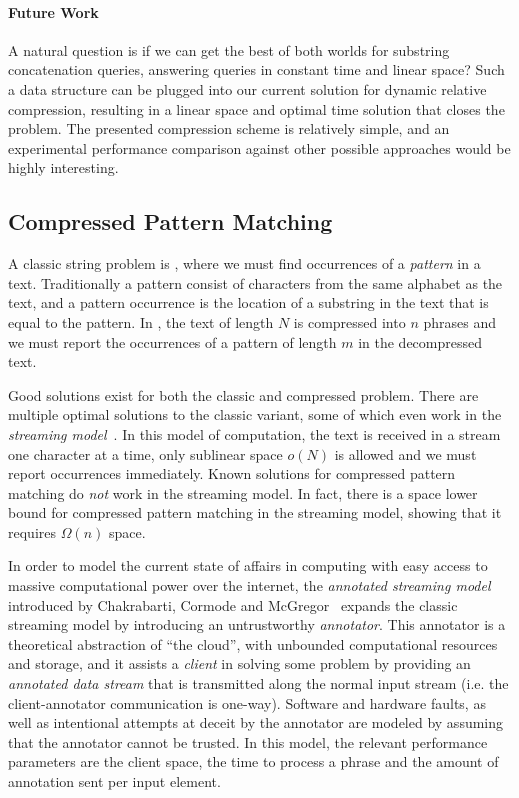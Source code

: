 \paragraph{Future Work}
A natural question is if we can get the best of both worlds for substring concatenation queries, answering queries in constant time and linear space? Such a data structure can be plugged into our current solution for dynamic relative compression, resulting in a linear space and optimal time solution that closes the problem.
The presented compression scheme is relatively simple, and an experimental performance comparison against other possible approaches would be highly interesting. 


\subsection{Compressed Pattern Matching}
A classic string problem is , where we must find occurrences of a \emph{pattern} in a text. Traditionally a pattern consist of characters from the same alphabet as the text, and a pattern occurrence is the location of a substring in the text that is equal to the pattern.
In , the text of length $N$ is compressed into $n$ phrases and we must report the occurrences of a pattern of length $m$ in the decompressed text. 

Good solutions exist for both the classic and compressed problem. There are multiple optimal solutions to the classic variant, some of which even work in the \emph{streaming model}~\cite{munro1980selection, flajolet1985probabilistic, alon1999space}. In this model of computation, the text is received in a stream one character at a time, only sublinear space $o(N)$ is allowed and we must report occurrences immediately.
Known solutions for compressed pattern matching do \emph{not} work in the streaming model. In fact, there is a space lower bound for compressed pattern matching in the streaming model, showing that it requires $\Omega(n)$ space. 

In order to model the current state of affairs in computing with easy access to massive computational power over the internet, the \emph{annotated streaming model} introduced by Chakrabarti, Cormode and McGregor~\cite{chakrabarti2009annotations, chakrabarti2014annotations} expands the classic streaming model by introducing an untrustworthy \emph{annotator}. 
This annotator is a theoretical abstraction of ``the cloud'', with unbounded computational resources and storage, and it assists a \emph{client} in solving some problem by providing an \emph{annotated data stream} that is transmitted along the normal input stream (i.e. the client-annotator communication is one-way). 
Software and hardware faults, as well as intentional attempts at deceit by the annotator are modeled by assuming that the annotator cannot be trusted.
In this model, the relevant performance parameters are the client space, the time to process a phrase and the amount of annotation sent per input element.


